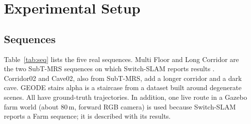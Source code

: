 \documentclass[journal]{IEEEtran}
\begin{document}
\begin{table}[t]
\caption{Frozen constants}
\label{tab:const}
\centering\footnotesize
{}
\end{table}

\section{Experimental Setup}
\subsection{Sequences}
Table~\ref{tab:seq} lists the five real sequences. Multi Floor and Long Corridor are the two SubT-MRS \cite{subtmrs2024} sequences on which Switch-SLAM reports results \cite{switchslam2024}. Corridor02 and Cave02, also from SubT-MRS, add a longer corridor and a dark cave. GEODE stairs alpha \cite{geode2026} is a staircase from a dataset built around degenerate scenes. All have ground-truth trajectories. In addition, one live route in a Gazebo farm world (about 80\,m, forward RGB camera) is used because Switch-SLAM reports a Farm sequence; it is described with its results.
\end{document}
